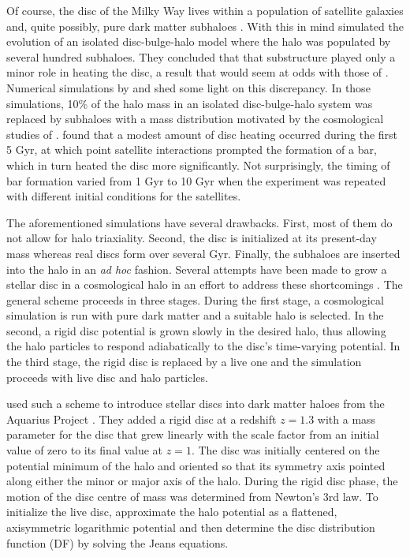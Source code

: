 Of course, the disc of the Milky Way lives within a population of
satellite galaxies and, quite possibly, pure dark matter subhaloes
\citep{mooresubhalos,Klypin1999}.  With this in mind \citet{Font2001}
simulated the evolution of an isolated disc-bulge-halo model where the
halo was populated by several hundred subhaloes.  They concluded that
that substructure played only a minor role in heating the disc, a
result that would seem at odds with those of \citet{kazantzidis2008}.
Numerical simulations by \citet{gauthier2006} and \citet{dubinski2008}
shed some light on this discrepancy.  In those simulations, 10\% of
the halo mass in an isolated disc-bulge-halo system was replaced by
subhaloes with a mass distribution motivated by the cosmological
studies of \citet{gao2004}.  \citet{gauthier2006} found that a modest
amount of disc heating occurred during the first 5 Gyr, at which point
satellite interactions prompted the formation of a bar, which in turn
heated the disc more significantly.  Not surprisingly, the timing of
bar formation varied from 1 Gyr to 10 Gyr when the experiment was
repeated with different initial conditions for the satellites.

The aforementioned simulations have several drawbacks.  First, most of them do
not allow for halo triaxiality.  Second, the disc is initialized at
its present-day mass whereas real discs form over several Gyr.
Finally, the subhaloes are inserted into the halo in an \textit{ad
  hoc} fashion.  Several attempts have been made to grow a stellar
disc in a cosmological halo in an effort to address these
shortcomings \citep{BerentzenShlosmanStellarDisks,DeBuhrStellarDisks, YurinSpringelStellarDisks}.  The general scheme proceeds in three stages.  During
the first stage, a cosmological simulation is run with pure dark
matter and a suitable halo is selected.  In the second, a rigid disc
potential is grown slowly in the desired halo, thus allowing the halo
particles to respond adiabatically to the disc's time-varying
potential.  In the third stage, the rigid disc is replaced by a live
one and the simulation proceeds with live disc and halo particles.

\citet{DeBuhrStellarDisks} used such a scheme to introduce stellar
discs into dark matter haloes from the Aquarius Project
\citep{springel2008}.  They added a rigid disc at a redshift $z=1.3$
with a mass parameter for the disc that grew linearly with the scale
factor from an initial value of zero to its final value at $z=1$.  The
disc was initially centered on the potential minimum of the halo and
oriented so that its symmetry axis pointed along either the minor or
major axis of the halo.  During the rigid disc phase, the motion of
the disc centre of mass was determined from Newton's 3rd law.
To initialize the live disc, \citet{DeBuhrStellarDisks} approximate
the halo potential as a flattened, axisymmetric logarithmic potential
and then determine the disc distribution function (DF) by solving the
Jeans equations.  

